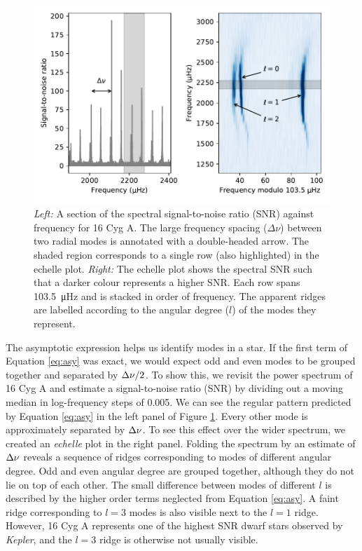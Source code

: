 \begin{figure}[tb]
    \centering
    \includegraphics{figures/seismo-echelle.pdf}
    \caption[Signal-to-noise ratio as a function of frequency and echelle diagram for 16 Cyg A.]{\emph{Left:} A section of the spectral signal-to-noise ratio (SNR) against frequency for 16 Cyg A. The large frequency spacing (\(\Delta\nu\)) between two radial modes is annotated with a double-headed arrow. The shaded region corresponds to a single row (also highlighted) in the echelle plot. \emph{Right:} The echelle plot shows the spectral SNR such that a darker colour represents a higher SNR. Each row spans \SI{103.5}{\micro\hertz} and is stacked in order of frequency. The apparent ridges are labelled according to the angular degree (\(l\)) of the modes they represent.}
    \label{fig:seismo-echelle}
\end{figure}

The asymptotic expression helps us identify modes in a star. If the first term of Equation \ref{eq:asy} was exact, we would expect odd and even modes to be grouped together and separated by \({\Delta\nu}/2\). To show this, we revisit the power spectrum of 16 Cyg A and estimate a signal-to-noise ratio (SNR) by dividing out a moving median in log-frequency steps of \SI{0.005}{\dex}. We can see the regular pattern predicted by Equation \ref{eq:asy} in the left panel of Figure \ref{fig:seismo-echelle}. Every other mode is approximately separated by \({\Delta\nu}\). To see this effect over the wider spectrum, we created an \emph{echelle} plot in the right panel. Folding the spectrum by an estimate of \({\Delta\nu}\) reveals a sequence of ridges corresponding to modes of different angular degree. Odd and even angular degree are grouped together, although they do not lie on top of each other. The small difference between modes of different \(l\) is described by the higher order terms neglected from Equation \ref{eq:asy}. A faint ridge corresponding to \(l=3\) modes is also visible next to the \(l=1\) ridge. However, 16 Cyg A represents one of the highest SNR dwarf stars observed by \emph{Kepler}, and the \(l=3\) ridge is otherwise not usually visible. 

